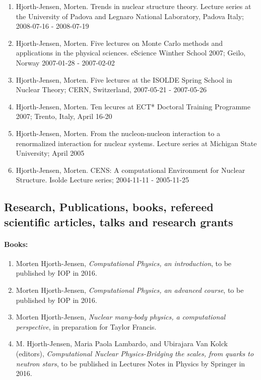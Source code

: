 \documentclass[%
oneside,                 %
final,                   %
10pt]{article}
\begin{document}
\begin{enumerate}
\item Hjorth-Jensen, Morten.  Trends in nuclear structure theory. Lecture series at the University of Padova and Legnaro National Laboratory, Padova Italy; 2008-07-16 - 2008-07-19

\item Hjorth-Jensen, Morten.  Five lectures on  Monte Carlo methods and applications in the physical sciences. eScience Winther School 2007; Geilo, Norway 2007-01-28 - 2007-02-02

\item Hjorth-Jensen, Morten.  Five lectures at the ISOLDE Spring School in Nuclear Theory; CERN, Switzerland, 2007-05-21 - 2007-05-26

\item Hjorth-Jensen, Morten.  Ten lecures at  ECT* Doctoral Training Programme 2007; Trento, Italy, April 16-20

\item Hjorth-Jensen, Morten.  From the nucleon-nucleon interaction to a renormalized interaction for nuclear systems. Lecture series at Michigan State University; April 2005

\item Hjorth-Jensen, Morten. CENS: A computational Environment for Nuclear Structure. Isolde Lecture series; 2004-11-11 - 2005-11-25
\end{enumerate}

\noindent
\subsection*{Research, Publications, books, refereed scientific articles, talks and research grants}

\paragraph{Books:}
\begin{enumerate}
\item Morten Hjorth-Jensen, \emph{Computational Physics, an introduction}, to be published by IOP in 2016.

\item Morten Hjorth-Jensen, \emph{Computational Physics, an advanced course}, to be published by IOP in 2016.

\item Morten Hjorth-Jensen, \emph{Nuclear many-body physics, a computational perspective}, in preparation for Taylor Francis.

\item M. Hjorth-Jensen, Maria Paola Lambardo, and Ubirajara Van Kolck (editors), \emph{Computational Nuclear Physics-Bridging the scales, from quarks to neutron stars}, to be published in Lectures Notes in Physics by Springer in 2016.
\end{enumerate}
\end{document}
